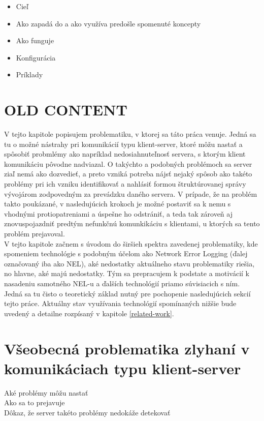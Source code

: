 \begin{itemize}
    \item Cieľ
    \item Ako zapadá do a ako využíva predošle spomenuté koncepty
    \item Ako funguje
    \item Konfigurácia
    \item Príklady
\end{itemize}



\section{OLD CONTENT}
V tejto kapitole popisujem problematiku, v ktorej sa táto práca venuje. Jedná sa tu o možné nástrahy pri komunikácií typu klient-server,
ktoré môžu nastať a spôsobiť probmlémy ako napríklad nedosiahnuteľnosť servera, s ktorým klient komunikáciu pôvodne nadviazal.
O takýchto a podobných problémoch sa server ziaľ nemá ako dozvedieť, a preto vzniká potreba nájsť nejaký spôsob ako takéto problémy pri ich
vzniku identifikovať a nahlásiť formou štruktúrovanej správy vývojárom zodpovedným za prevádzku daného servera. V prípade, že 
na problém takto poukázané, v nasledujúcich krokoch je možné postaviť sa k nemu s vhodnými protiopatreniami a úspešne ho odstrániť, a teda 
tak zároveň aj znovuspojazdniť predtým nefunkčnú komunkikáciu s klientami, u ktorých sa tento problém prejavoval.
\\
V tejto kapitole začnem s úvodom do širšieh spektra zavedenej problematiky, kde spomeniem technológie s podobným účelom 
ako Network Error Logging (ďalej označovaný iba ako NEL), aké nedostatky aktuálneho stavu problematiky riešia, no hlavne, aké majú nedostatky. 
Tým sa prepracujem k podstate a motivácií k nasadeniu samotného NEL-u a ďalších technológií priamo súvisiacich s ním. 
Jedná sa tu čisto o teoretický základ nutný pre pochopenie nasledujúcich sekcií tejto práce. 
Aktuálny stav využívania technológií spomínaných nižšie bude uvedený a detailne rozpísaný v kapitole \ref{related-work}.

\section{Všeobecná problematika zlyhaní v komunikáciach typu klient-server}

Aké problémy môžu nastať
\\
Ako sa to prejavuje
\\
Dôkaz, že server takéto problémy nedokáže detekovať

